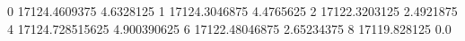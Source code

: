 0 17124.4609375 4.6328125
1 17124.3046875 4.4765625
2 17122.3203125 2.4921875
4 17124.728515625 4.900390625
6 17122.48046875 2.65234375
8 17119.828125 0.0
